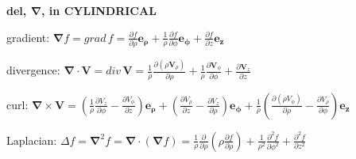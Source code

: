 \documentclass[letterpaper,landscape,10pt]{article}
\newenvironment{mydescription}
{\begin{description}
	\setlength{\itemsep}{0pt}
	\setlength{\parskip}{0pt}
	\setlength{\parsep}{-1pt}}
{\end{description}}
\begin{document}
{\begin{multicols}{4}
		\begin{center}\textbf{del, $\bm{\nabla}$, in CYLINDRICAL}\end{center}
		\begin{mydescription}
			\item[gradient:]
				$\bm{\nabla}f =
				grad\,f =
				\frac{\partial f}{\partial\rho}\bm{e_\rho} +
				\frac{1}{\rho}\frac{\partial f}{\partial\phi}\bm{e_\phi} +
				\frac{\partial f}{\partial z}\bm{e_z}$
			\item[divergence:]
				$\bm{\nabla}\cdot\bm{V} =
				div\, \bm{V} =
				\frac{1}{\rho}\frac{\partial(\rho\bm{V}_\rho)}{\partial\rho} +
				\frac{1}{\rho}\frac{\partial \bm{V}_\phi}{\partial\phi} +
				\frac{\partial \bm{V}_z}{\partial z}
				$
			\item[curl:]
				$\bm{\nabla}\times \bm{V} =
				\left({ \frac{1}{\rho}\frac{\partial V_z}{\partial\phi} -
					\frac{\partial V_\phi}{\partial z}}\right)\bm{e_\rho}+
				\left({ \frac{\partial V_\rho}{\partial z} -
					\frac{\partial  V_z}{\partial\rho}}\right)\bm{e_\phi}+
				\frac{1}{\rho}\left({
					\frac{\partial(\rho V_\phi)}{\partial\rho} -
					\frac{\partial V_\rho}{\partial\phi}}\right)\bm{e_z}
				$
			\item[Laplacian:]
				$\Delta f = \bm{\nabla}^2f =
				\bm{\nabla} \cdot (\bm{\nabla}f) =
				\frac{1}{\rho}\frac{\partial}{\partial\rho}\left({
				\rho\frac{\partial f}{\partial\rho}}\right) +
				\frac{1}{\rho^2}\frac{\partial^2 f}{\partial\phi^2} +
				\frac{\partial^2 f}{\partial z^2}
				$
		\end{mydescription}
		

\end{multicols}}
\end{document}
